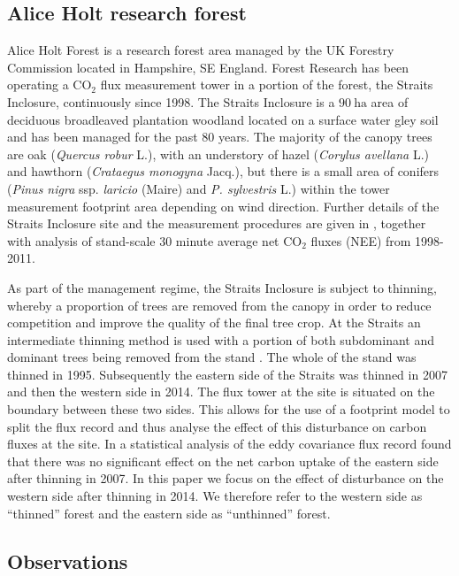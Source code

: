 \subsection{Alice Holt research forest} \label{sec:site_description}

Alice Holt Forest is a research forest area managed by the UK Forestry Commission located in Hampshire, SE England. Forest Research has been operating a $\text{CO}_{2}$ flux measurement tower in a portion of the forest, the Straits Inclosure, continuously since 1998. The Straits Inclosure is a $90~\text{ha}$ area of deciduous broadleaved plantation woodland located on a surface water gley soil and has been managed for the past 80 years. The majority of the canopy trees are oak (\textit{Quercus robur} L.), with an understory of hazel (\textit{Corylus avellana} L.) and hawthorn (\textit{Crataegus monogyna} Jacq.), but there is a small area of conifers (\textit{Pinus nigra} ssp. \textit{laricio} (Maire) and \textit{P. sylvestris} L.) within the tower measurement footprint area depending on wind direction. Further details of the Straits Inclosure site and the measurement procedures are given in \citet{wilkinson2012inter}, together with analysis of stand-scale $30$ minute average net $\text{CO}_{2}$ fluxes (NEE) from 1998-2011. 

As part of the management regime, the Straits Inclosure is subject to thinning, whereby a proportion of trees are removed from the canopy in order to reduce competition and improve the quality of the final tree crop. At the Straits an intermediate thinning method is used with a portion of both subdominant and dominant trees being removed from the stand \citep{kerr2011thinning}. The whole of the stand was thinned in 1995. Subsequently the eastern side of the Straits was thinned in 2007 and then the western side in 2014. The flux tower at the site is situated on the boundary between these two sides. This allows for the use of a footprint model to split the flux record and thus analyse the effect of this disturbance on carbon fluxes at the site. In \citet{wilkinson2015effects} a statistical analysis of the eddy covariance flux record found that there was no significant effect on the net carbon uptake of the eastern side after thinning in 2007. In this paper we focus on the effect of disturbance on the western side after thinning in 2014. We therefore refer to the western side as ``thinned'' forest and the eastern side as ``unthinned'' forest.   

\subsection{Observations} \label{sec:obs}

